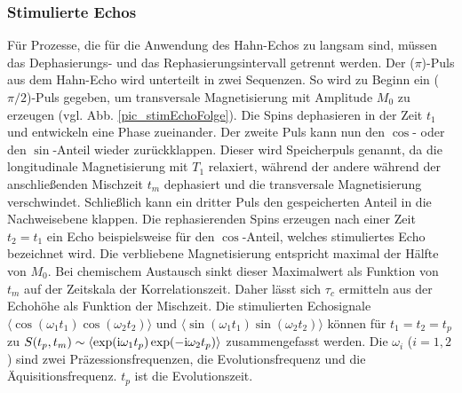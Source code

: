 \subsubsection{Stimulierte Echos}
Für Prozesse, die für die Anwendung des Hahn-Echos zu langsam sind, müssen das Dephasierungs- und das Rephasierungsintervall getrennt werden. Der ($\pi$)-Puls
aus dem Hahn-Echo wird unterteilt in zwei Sequenzen. So wird zu Beginn ein ($\pi/2$)-Puls gegeben, um transversale Magnetisierung mit Amplitude $M_0$ zu
erzeugen (vgl. Abb. \ref{pic_stimEchoFolge}). Die Spins dephasieren in der Zeit $t_1$ und entwickeln eine Phase zueinander. Der zweite Puls kann nun den 
$\cos$- oder den $\sin$-Anteil wieder zurückklappen. Dieser wird Speicherpuls genannt, da die longitudinale Magnetisierung mit $T_1$ relaxiert, während
der andere während der anschließenden Mischzeit $t_m$ dephasiert und die transversale Magnetisierung verschwindet. Schließlich kann ein dritter Puls den
gespeicherten Anteil in die Nachweisebene klappen. Die rephasierenden Spins erzeugen nach einer Zeit $t_2 = t_1$ ein Echo beispielsweise für den $\cos$-Anteil,
welches stimuliertes Echo bezeichnet wird. Die verbliebene Magnetisierung entspricht maximal der Hälfte von $M_0$. Bei chemischem Austausch sinkt dieser
Maximalwert als Funktion von $t_m$ auf der Zeitskala der Korrelationszeit. Daher lässt sich $\tau_c$ ermitteln aus der Echohöhe als Funktion der Mischzeit. Die stimulierten 
Echosignale $\langle\cos(\omega_1t_1)\cos(\omega_2t_2)\rangle$ und $\langle\sin(\omega_1t_1)\sin(\omega_2t_2)\rangle$ können für $t_1=t_2=t_p$ zu
$S(t_p,t_m) \sim \langle\exp(\text{i}\omega_1t_p)\exp(-\text{i}\omega_2t_p)\rangle$ zusammengefasst werden. Die $\omega_i$ ($i=1,2$) sind zwei Präzessionsfrequenzen,
die Evolutionsfrequenz und die Äquisitionsfrequenz. $t_p$ ist die Evolutionszeit.

